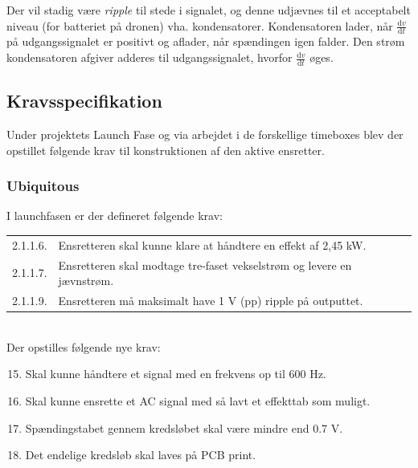Der vil stadig være \textit{ripple} til stede i signalet, og denne udjævnes til et acceptabelt niveau (for batteriet på dronen) vha. kondensatorer. Kondensatoren lader, når $\frac{\mathrm{d}v}{\mathrm{d}t}$ på udgangssignalet er positivt og aflader, når spændingen igen falder. Den strøm kondensatoren afgiver adderes til udgangssignalet, hvorfor $\frac{\mathrm{d}v}{\mathrm{d}t}$ øges.

\subsection{Kravsspecifikation}
\label{sec:kravsspecifikation-4}

Under projektets Launch Fase og via arbejdet i de forskellige timeboxes blev der opstillet følgende krav til konstruktionen af den aktive ensretter.

\subsubsection{Ubiquitous}
\label{sec:ubiquitous}

I launchfasen er der defineret følgende krav:
\vspace{1em}
\begin{tabular}[h]{ll}
2.1.1.6. &Ensretteren skal kunne klare at håndtere en effekt af 2,45 kW.\vspace{0.5em}\\
2.1.1.7. &Ensretteren skal modtage tre-faset vekselstrøm og levere en jævnstrøm.\vspace{0.5em}\\
2.1.1.9. &Ensretteren må maksimalt have 1 V (pp) ripple på outputtet.\vspace{0.5em}\\
\end{tabular}
\vspace{1em}\\

Der opstilles følgende nye krav:
\begin{enumerate}[label=2.1.1.\arabic*]
  \setcounter{enumi}{14}
\item Skal kunne håndtere et signal med en frekvens op til 600 Hz.
\item Skal kunne ensrette et AC signal med så lavt et effekttab som muligt.
\item Spændingstabet gennem kredsløbet skal være mindre end 0.7 V.
\item Det endelige kredsløb skal laves på PCB print.
\end{enumerate}


